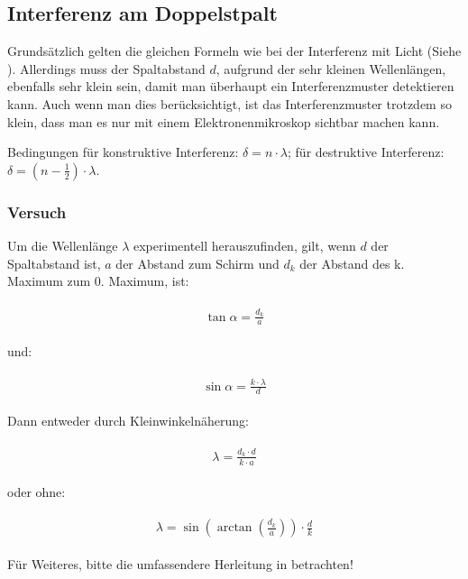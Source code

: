 \subsection{Interferenz am Doppelstpalt}

Grundsätzlich gelten die gleichen Formeln wie bei der Interferenz mit Licht (Siehe ). Allerdings muss der Spaltabstand $d$, aufgrund der sehr kleinen Wellenlängen, ebenfalls sehr klein sein, damit man überhaupt ein Interferenzmuster detektieren kann. Auch wenn man dies berücksichtigt, ist das Interferenzmuster trotzdem so klein, dass man es nur mit einem Elektronenmikroskop sichtbar machen kann.

Bedingungen für konstruktive Interferenz: $\delta = n \cdot \lambda$; für destruktive Interferenz: $\delta = (n-\frac{1}{2}) \cdot \lambda$.


\subsubsection{Versuch}

Um die Wellenlänge $\lambda$ experimentell herauszufinden, gilt, wenn $d$ der Spaltabstand ist, $a$ der Abstand zum Schirm und $d_k$ der Abstand des k. Maximum zum 0. Maximum, ist:

\begin{align}
\begin{split}
	\tan{\alpha} = \frac{d_k}{a}
\end{split}
\end{align}

\noindent und:

\begin{align}
\begin{split}
	\sin{\alpha} = \frac{k \cdot\lambda}{d}
\end{split}
\end{align}

\noindent Dann entweder durch Kleinwinkelnäherung:

\begin{align}
\begin{split}
	\lambda = \frac{d_k \cdot d}{k \cdot a}
\end{split}
\end{align}

\noindent oder ohne:

\begin{align}
\begin{split}
	\lambda = \sin(\arctan(\frac{d_k}{a})) \cdot \frac{d}{k}
\end{split}
\end{align}


\noindent Für Weiteres, bitte die umfassendere Herleitung in  betrachten!